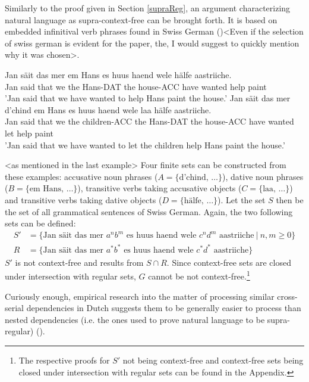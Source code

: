 Similarly to the proof given in Section \ref{supraReg}, an argument characterizing natural language as supra-context-free can be brought forth. It is based on embedded infinitival verb phrases found in Swiss German (\cite{Shieber1987})<Even if the selection of swiss german is evident for the paper, the, I would suggest to quickly mention why it was chosen>.
\begin{exe}
	\ex
	\gll Jan säit das mer em Hans es huus haend wele hälfe aastriiche. \\
	Jan said that we the Hans-DAT the house-ACC have wanted help paint \\
	\trans 'Jan said that we have wanted to help Hans paint the house.'
	\ex
	\gll Jan säit das mer d'chind em Hans es huus haend wele laa hälfe aastriiche. \\
	Jan said that we the children-ACC the Hans-DAT the house-ACC have wanted let help paint \\
	\trans 'Jan said that we have wanted to let the children help Hans paint the house.'
\end{exe}
<as mentioned in the last example>
Four finite sets can be constructed from these examples: accusative noun phrases ($A = \lbrace \text{d'chind}, \, \dots \rbrace$), dative noun phrases ($B = \lbrace \text{em Hans}, \, \dots \rbrace$), transitive verbs taking accusative objects ($C = \lbrace \text{laa}, \, \dots \rbrace$) and transitive verbs taking dative objects ($D = \lbrace \text{hälfe}, \, \dots \rbrace$). Let the set $S$ then be the set of all grammatical sentences of Swiss German. Again, the two following sets can be defined:
\begin{align*}
S' &= \lbrace \text{Jan säit das mer } a^{n}b^{m} \text{ es huus haend wele } c^{n}d^{m} \text{ aastriiche} \: \vert \: n, m \geq 0 \rbrace \\
R &= \lbrace \text{Jan säit das mer } a^{*}b^{*} \text{ es huus haend wele } c^{*}d^{*} \text{ aastriiche} \rbrace
\end{align*}
$S'$ is not context-free and results from $S \cap R$. Since context-free sets are closed under intersection with regular sets, $G$ cannot be not context-free.\footnote{The respective proofs for $S'$ not being context-free and context-free sets being closed under intersection with regular sets can be found in the Appendix.}

Curiously enough, empirical research into the matter of processing similar cross-serial dependencies in Dutch suggests them to be generally easier to process than nested dependencies (i.e. the ones used to prove natural language to be supra-regular) (\cite{Bach1986}).

